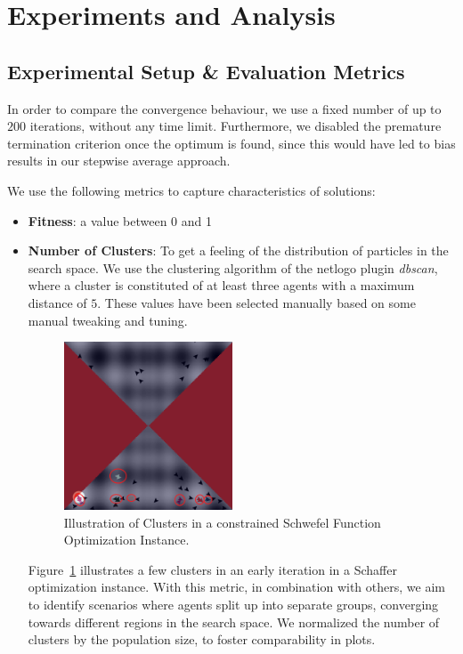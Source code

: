 \documentclass[12pt]{article}
\begin{document}
\section{Experiments and Analysis}
\subsection{Experimental Setup \& Evaluation Metrics}
In order to compare the convergence behaviour, we use a fixed number of up to $200$ iterations, without any time limit. 
Furthermore, we disabled the premature termination criterion once the optimum is found, since this would have led to bias results in our stepwise average approach. 

We use the following metrics to capture characteristics of solutions:
\begin{itemize}
	\item \textbf{Fitness}: a value between 0 and 1
	\item \textbf{Number of Clusters}: To get a feeling of the distribution of particles in the search space.
	We use the clustering algorithm of the netlogo plugin \emph{dbscan}, where a cluster is constituted of at least three agents with a maximum distance of $5$. 
	These values have been selected manually based on some manual tweaking and tuning. 
	
	\begin{figure}[h!]
		\centering
			\includegraphics[width=5cm]{figures/clusters.png}
			\caption{Illustration of Clusters in a constrained Schwefel Function Optimization Instance.}
			\label{fig:clusters}
	\end{figure}	

	Figure~\ref{fig:clusters} illustrates a few clusters in an early iteration in a Schaffer optimization instance. 
	With this metric, in combination with others, we aim to identify scenarios where agents split up into separate groups, converging towards different regions in the search space. 
	We normalized the number of clusters by the population size, to foster comparability in plots. 
	

\end{itemize}
\end{document}

